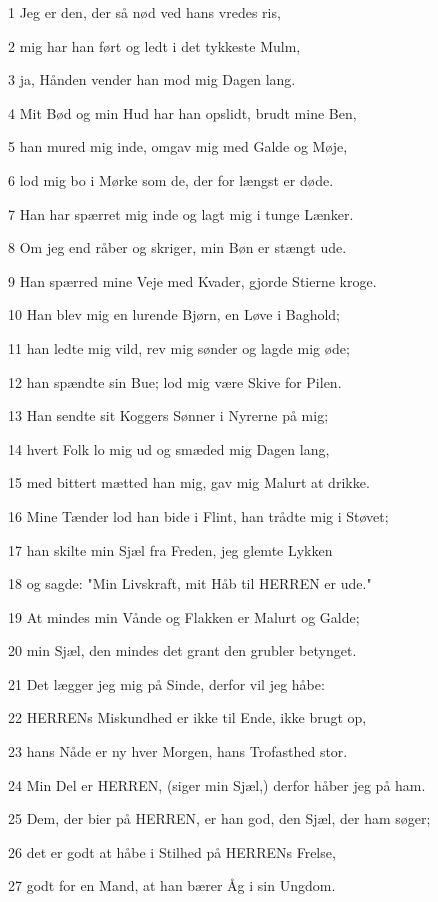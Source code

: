 \par 1 Jeg er den, der så nød ved hans vredes ris,
\par 2 mig har han ført og ledt i det tykkeste Mulm,
\par 3 ja, Hånden vender han mod mig Dagen lang.
\par 4 Mit Bød og min Hud har han opslidt, brudt mine Ben,
\par 5 han mured mig inde, omgav mig med Galde og Møje,
\par 6 lod mig bo i Mørke som de, der for længst er døde.
\par 7 Han har spærret mig inde og lagt mig i tunge Lænker.
\par 8 Om jeg end råber og skriger, min Bøn er stængt ude.
\par 9 Han spærred mine Veje med Kvader, gjorde Stierne kroge.
\par 10 Han blev mig en lurende Bjørn, en Løve i Baghold;
\par 11 han ledte mig vild, rev mig sønder og lagde mig øde;
\par 12 han spændte sin Bue; lod mig være Skive for Pilen.
\par 13 Han sendte sit Koggers Sønner i Nyrerne på mig;
\par 14 hvert Folk lo mig ud og smæded mig Dagen lang,
\par 15 med bittert mætted han mig, gav mig Malurt at drikke.
\par 16 Mine Tænder lod han bide i Flint, han trådte mig i Støvet;
\par 17 han skilte min Sjæl fra Freden, jeg glemte Lykken
\par 18 og sagde: "Min Livskraft, mit Håb til HERREN er ude."
\par 19 At mindes min Vånde og Flakken er Malurt og Galde;
\par 20 min Sjæl, den mindes det grant den grubler betynget.
\par 21 Det lægger jeg mig på Sinde, derfor vil jeg håbe:
\par 22 HERRENs Miskundhed er ikke til Ende, ikke brugt op,
\par 23 hans Nåde er ny hver Morgen, hans Trofasthed stor.
\par 24 Min Del er HERREN, (siger min Sjæl,) derfor håber jeg på ham.
\par 25 Dem, der bier på HERREN, er han god, den Sjæl, der ham søger;
\par 26 det er godt at håbe i Stilhed på HERRENs Frelse,
\par 27 godt for en Mand, at han bærer Åg i sin Ungdom.
